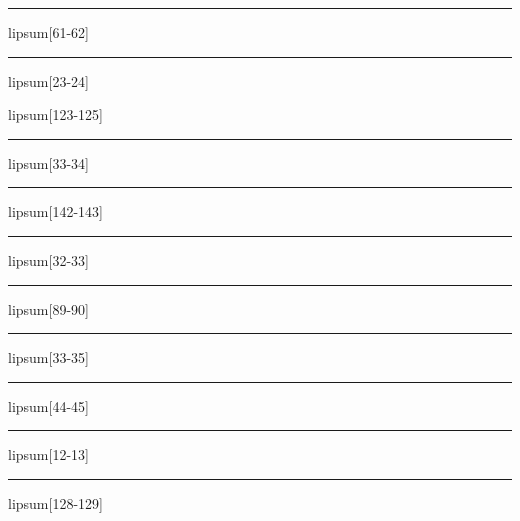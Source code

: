 \documentclass[11pt,a4paper]{article}
\begin{document}
\begin{simplewrap}
  \textcolor{cyan!24}{\rule{3.4cm}{3.6cm}}
\end{simplewrap}
lipsum[61-62]

\begin{simplewrap}
  \textcolor{red!33}{\rule{4.7cm}{5.0cm}}
\end{simplewrap}
lipsum[23-24]

lipsum[123-125]

\begin{simplewrap}
  \textcolor{cyan!36}{\rule{5.3cm}{8.6cm}}
\end{simplewrap}
lipsum[33-34]

\begin{simplewrap}
  \textcolor{green!38}{\rule{4.4cm}{6.1cm}}
\end{simplewrap}
lipsum[142-143]

\begin{simplewrap}
  \textcolor{cyan!59}{\rule{5.9cm}{5.5cm}}
\end{simplewrap}
lipsum[32-33]

\begin{simplewrap}
  \textcolor{violet!20}{\rule{3.5cm}{9.5cm}}
\end{simplewrap}
lipsum[89-90]

\begin{simplewrap}
  \textcolor{cyan!28}{\rule{5.5cm}{4.0cm}}
\end{simplewrap}
lipsum[33-35]

\begin{simplewrap}
  \textcolor{magenta!15}{\rule{4.5cm}{3.3cm}}
\end{simplewrap}
lipsum[44-45]

\begin{simplewrap}
  \textcolor{brown!46}{\rule{3.1cm}{8.9cm}}
\end{simplewrap}
lipsum[12-13]

\begin{simplewrap}
  \textcolor{teal!51}{\rule{3.6cm}{6.6cm}}
\end{simplewrap}
lipsum[128-129]
\end{document}
